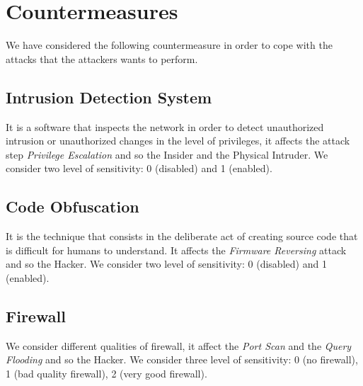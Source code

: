 \section{Countermeasures}
\noindent We have considered the following countermeasure in order to cope with the attacks that the attackers wants to perform.

\subsection*{Intrusion Detection System}
\noindent It is a software that inspects the network in order to detect unauthorized intrusion or unauthorized changes in the level of privileges, it affects the attack step \textit{Privilege Escalation} and so the Insider and the Physical Intruder. We consider two level of sensitivity: 0 (disabled) and 1 (enabled).


\subsection*{Code Obfuscation}
\noindent It is the technique that consists in the deliberate act of creating source code that is difficult for humans to understand. It affects the \textit{Firmware Reversing} attack and so the Hacker. We consider two level of sensitivity: 0 (disabled) and 1 (enabled).

\subsection*{Firewall}
\noindent We consider different qualities of firewall, it affect the \textit{Port Scan} and the \textit{Query Flooding} and so the Hacker. We consider three level of sensitivity: 0 (no firewall), 1 (bad quality firewall), 2 (very good firewall).



